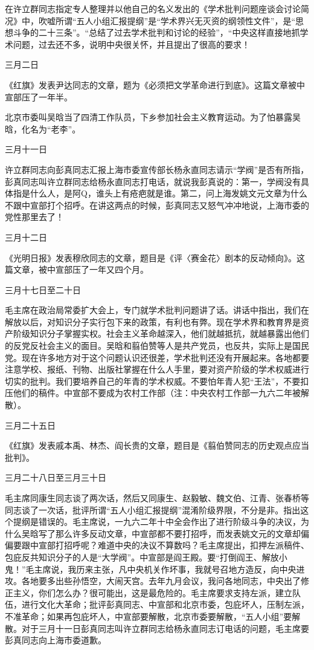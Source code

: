 \begin{maonote}
在许立群同志指定专人整理并以他自己的名义发出的《学术批判问题座谈会讨论简况》中，吹嘘所谓“五人小组汇报提纲”是“学术界兴无灭资的纲领性文件”，是“思想斗争的二十三条”。“总结了过去学术批判和讨论的经验”，“中央这样直接地抓学术问题，过去还不多，说明中央很关怀，并且提出了很高的要求！

三月二日

《红旗》发表尹达同志的文章，题为《必须把文学革命进行到底》。这篇文章被中宣部压了一年半。

北京市委叫吴晗当了四清工作队员，下乡参加社会主义教育运动。为了怕暴露吴晗，化名为“老李”。

三月十一日

许立群同志向彭真同志汇报上海市委宣传部长杨永直同志请示“学阀”是否有所指，彭真同志叫许立群同志给杨永直同志打电话，就说我彭真说的：第一，学阀没有具体指是什么人，是阿Q，谁头上有疮疤就是谁。第二，问上海发姚文元文章为什么不跟中宣部打个招呼。在讲这两点的时候，彭真同志又怒气冲冲地说，上海市委的党性那里去了！

三月十二日

《光明日报》发表穆欣同志的文章，题目是《评〈赛金花〉剧本的反动倾向》。这篇文章，被中宣部压了一年又四个月。

三月十七日至二十日

毛主席在政治局常委扩大会上，专门就学术批判问题讲了话。讲话中指出，我们在解放以后，对知识分子实行包下来的政策，有利也有弊。现在学术界和教育界是资产阶级知识分子掌握实权。社会主义革命越深入，他们就越抵抗，就越暴露出他们的反党反社会主义的面目。吴晗和翦伯赞等人是共产党员，也反共，实际上是国民党。现在许多地方对于这个问题认识还很差，学术批判还没有开展起来。各地都要注意学校、报纸、刊物、出版社掌握在什么人手里，要对资产阶级的学术权威进行切实的批判。我们要培养自己的年青的学术权威。不要怕年青人犯“王法”，不要扣压他们的稿件。中宣部不要成为农村工作部（注：中央农村工作部一九六二年被解散）。

三月二十五日

《红旗》发表戚本禹、林杰、阎长贵的文章，题目是《翦伯赞同志的历史观点应当批判》。

三月二十八日至三月三十日

毛主席同康生同志谈了两次话，然后又同康生、赵毅敏、魏文伯、江青、张春桥等同志谈了一次话，批评所谓“五人小组汇报提纲”混淆阶级界限，不分是非。指出这个提纲是错误的。毛主席说，一九六二年十中全会作出了进行阶级斗争的决议，为什么吴晗写了那么许多反动文章，中宣部都不要打招呼，而发表姚文元的文章却偏偏要跟中宣部打招呼呢？难道中央的决议不算数吗？毛主席提出，扣押左派稿件、包庇反共知识分子的人是“大学阀”。中宣部是阎王殿。要“打倒阎王、解放小鬼！”毛主席说，我历来主张，凡中央机关作坏事，我就号召地方造反，向中央进攻。各地要多出些孙悟空，大闹天宫。去年九月会议，我问各地同志，中央出了修正主义，你们怎么办？很可能出，这是最危险的。毛主席要求支持左派，建立队伍，进行文化大革命；批评彭真同志、中宣部和北京市委，包庇坏人，压制左派，不准革命；如果再包庇坏人，中宣部要解散，北京市委要解散，“五人小组”要解散。对于三月十一日彭真同志叫许立群同志给杨永直同志订电话的问题，毛主席要彭真同志向上海市委道歉。


\end{maonote}
